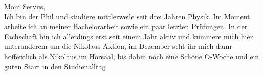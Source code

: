 \begin{multicols}{2}
{
Moin Servus, \\ 
Ich bin der Phil und studiere mittlerweile seit drei Jahren Physik. Im Moment arbeite ich an meiner Bachelorarbeit sowie ein paar letzten Prüfungen. In der Fachschaft bin ich allerdings erst seit einem Jahr aktiv und kümmere mich hier unteranderem um die Nikolaus Aktion, im Dezember seht ihr mich dann hoffentlich als Nikolaus im Hörsaal, bis dahin noch eine Schöne O-Woche und ein guten Start in den Studienalltag
}

\vspace{0.3cm}


\end{multicols}
